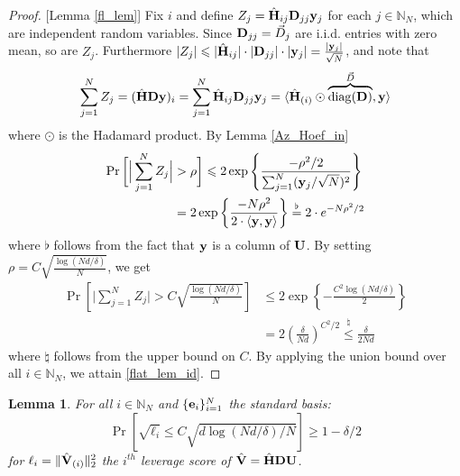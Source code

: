 \documentclass[journal,letterpaper,onecolumn,twoside,nofonttune]{IEEEtran}
\newcommand{\Ub}{\bold{U}}
\newcommand{\yb}{\bold{y}}
\newcommand{\N}{\mathbb{N}}
\newcommand{\Db}{\bold{D}}
\newcommand{\eb}{\bold{e}}
\newcommand{\Hbh}{\hat{\bold{H}}}
\newcommand{\Vbh}{\hat{\bold{V}}}
\newcommand{\diag}{\mathrm{diag}}
\newtheorem{Lemma}{Lemma}
\begin{document}
\begin{proof}{[Lemma \ref{fl_lem}]}
Fix $i$ and define $Z_j=\Hbh_{ij}\Db_{jj}\yb_j$ for each $j\in\N_N$, which are independent random variables. Since $\Db_{jj}=\vec{D}_j$ are i.i.d. entries with zero mean, so are $Z_j$. Furthermore $|Z_j| \leqslant |\Hbh_{ij}|\cdot|\Db_{jj}|\cdot|\yb_j| = \frac{|\yb_j|}{\sqrt{N}}$, and note that
$$ \sum_{j=1}^NZ_j=(\Hbh\Db\yb)_{i}=\sum_{j=1}^N\Hbh_{ij}\Db_{jj}\yb_j=\langle\Hbh_{(i)}\odot \overbrace{\diag(\Db)}^{\vec{D}},\yb\rangle $$
where $\odot$ is the Hadamard product. By Lemma \ref{Az_Hoef_in}
\begin{align}
\label{pr_sum_Zj}
  \Pr\bigg[\Big|\sum_{j=1}^N Z_j\Big|&>\rho\bigg] \leqslant 2\exp\left\{\frac{-\rho^2/2}{\sum_{j=1}^N(\yb_j/\sqrt{N})^2}\right\}\notag\\
  &= 2\exp\left\{\frac{-N\rho^2}{2\cdot\langle\yb,\yb\rangle}\right\} \overset{\flat}{=} 2\cdot e^{-N\rho^2/2}
\end{align}
where $\flat$ follows from the fact that $\yb$ is a column of $\Ub$. By setting $\rho=C\sqrt{\frac{\log(Nd/\delta)}{N}}$, we get
\begin{align*}
  \Pr\left[\Big|\sum_{j=1}^N Z_j\Big|>C\sqrt{\frac{\log(Nd/\delta)}{N}}\right] &\leqslant 2\exp\left\{-\frac{C^2\log(Nd/\delta)}{2}\right\}\\
  &= 2\left(\frac{\delta}{Nd}\right)^{C^2/2} \overset{\natural}{\leqslant} \frac{\delta}{2Nd}
\end{align*}
where $\natural$ follows from the upper bound on $C$. By applying the union bound over all $i\in\N_N$, we attain \eqref{flat_lem_id}.
\end{proof}

\begin{Lemma}
\label{bd_lvg_Had}  %
  For all $i\in\N_N$ and $\{\eb_i\}_{i=1}^N$ the standard basis:
  $$ \Pr\left[\sqrt{\ell_i}\leqslant C\sqrt{d\log(Nd/\delta)/N}\right]\geqslant 1-\delta/2 $$
  for $\ell_i=\|\Vbh_{(i)}\|_2^2$ the $i^{th}$ leverage score of $\Vbh=\Hbh\Db\Ub$.
\end{Lemma}
\end{document}
